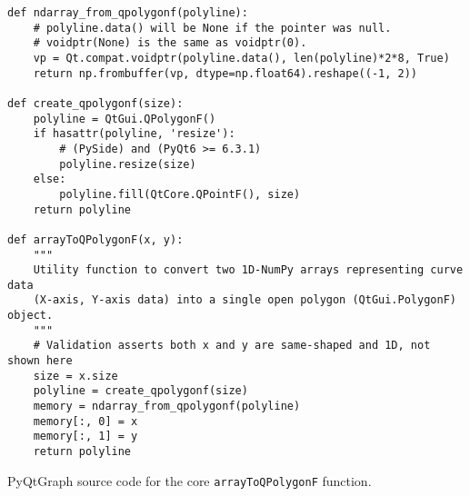 \renewcommand\textfraction{.05}
\begin{table*}[!hbt]
\begin{verbatim}
def ndarray_from_qpolygonf(polyline):
    # polyline.data() will be None if the pointer was null.
    # voidptr(None) is the same as voidptr(0).
    vp = Qt.compat.voidptr(polyline.data(), len(polyline)*2*8, True)
    return np.frombuffer(vp, dtype=np.float64).reshape((-1, 2))

def create_qpolygonf(size):
    polyline = QtGui.QPolygonF()
    if hasattr(polyline, 'resize'):
        # (PySide) and (PyQt6 >= 6.3.1)
        polyline.resize(size)
    else:
        polyline.fill(QtCore.QPointF(), size)
    return polyline

def arrayToQPolygonF(x, y):
    """
    Utility function to convert two 1D-NumPy arrays representing curve data
    (X-axis, Y-axis data) into a single open polygon (QtGui.PolygonF) object.
    """
    # Validation asserts both x and y are same-shaped and 1D, not shown here
    size = x.size
    polyline = create_qpolygonf(size)
    memory = ndarray_from_qpolygonf(polyline)
    memory[:, 0] = x
    memory[:, 1] = y
    return polyline
\end{verbatim}
\caption{PyQtGraph source code for the core \texttt{arrayToQPolygonF} function.}
\label{table:arrayToQPolygonF}
\end{table*}

